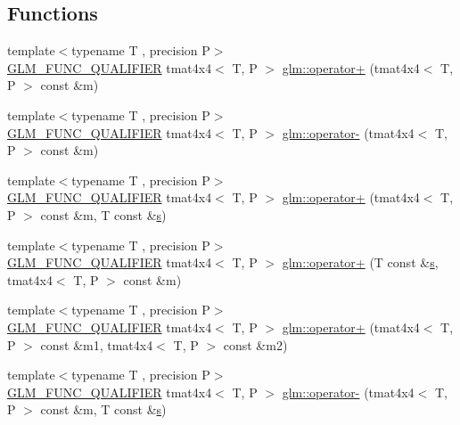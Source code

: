 \subsection*{Functions}
\begin{DoxyCompactItemize}
\item 
{\footnotesize template$<$typename T , precision P$>$ }\\\mbox{\hyperlink{setup_8hpp_a33fdea6f91c5f834105f7415e2a64407}{G\+L\+M\+\_\+\+F\+U\+N\+C\+\_\+\+Q\+U\+A\+L\+I\+F\+I\+ER}} tmat4x4$<$ T, P $>$ \mbox{\hyperlink{namespaceglm_a9989e7e3651cecf45c9b7e856978fac0}{glm\+::operator+}} (tmat4x4$<$ T, P $>$ const \&m)
\item 
{\footnotesize template$<$typename T , precision P$>$ }\\\mbox{\hyperlink{setup_8hpp_a33fdea6f91c5f834105f7415e2a64407}{G\+L\+M\+\_\+\+F\+U\+N\+C\+\_\+\+Q\+U\+A\+L\+I\+F\+I\+ER}} tmat4x4$<$ T, P $>$ \mbox{\hyperlink{namespaceglm_a86d70820c6583189bf78bef7a6bd6797}{glm\+::operator-\/}} (tmat4x4$<$ T, P $>$ const \&m)
\item 
{\footnotesize template$<$typename T , precision P$>$ }\\\mbox{\hyperlink{setup_8hpp_a33fdea6f91c5f834105f7415e2a64407}{G\+L\+M\+\_\+\+F\+U\+N\+C\+\_\+\+Q\+U\+A\+L\+I\+F\+I\+ER}} tmat4x4$<$ T, P $>$ \mbox{\hyperlink{namespaceglm_a8d33b2d0bb5b44913406bc51d992dbb2}{glm\+::operator+}} (tmat4x4$<$ T, P $>$ const \&m, T const \&\mbox{\hyperlink{glad_8h_af1b1d5edfea6a34daee7389b1b5810ad}{s}})
\item 
{\footnotesize template$<$typename T , precision P$>$ }\\\mbox{\hyperlink{setup_8hpp_a33fdea6f91c5f834105f7415e2a64407}{G\+L\+M\+\_\+\+F\+U\+N\+C\+\_\+\+Q\+U\+A\+L\+I\+F\+I\+ER}} tmat4x4$<$ T, P $>$ \mbox{\hyperlink{namespaceglm_adaf33419391a9f6e8779a0f74199013b}{glm\+::operator+}} (T const \&\mbox{\hyperlink{glad_8h_af1b1d5edfea6a34daee7389b1b5810ad}{s}}, tmat4x4$<$ T, P $>$ const \&m)
\item 
{\footnotesize template$<$typename T , precision P$>$ }\\\mbox{\hyperlink{setup_8hpp_a33fdea6f91c5f834105f7415e2a64407}{G\+L\+M\+\_\+\+F\+U\+N\+C\+\_\+\+Q\+U\+A\+L\+I\+F\+I\+ER}} tmat4x4$<$ T, P $>$ \mbox{\hyperlink{namespaceglm_a25f82613cbb54d1328ba0c087361f23a}{glm\+::operator+}} (tmat4x4$<$ T, P $>$ const \&m1, tmat4x4$<$ T, P $>$ const \&m2)
\item 
{\footnotesize template$<$typename T , precision P$>$ }\\\mbox{\hyperlink{setup_8hpp_a33fdea6f91c5f834105f7415e2a64407}{G\+L\+M\+\_\+\+F\+U\+N\+C\+\_\+\+Q\+U\+A\+L\+I\+F\+I\+ER}} tmat4x4$<$ T, P $>$ \mbox{\hyperlink{namespaceglm_a663ddfcf136f3a13694686bb0697bbde}{glm\+::operator-\/}} (tmat4x4$<$ T, P $>$ const \&m, T const \&\mbox{\hyperlink{glad_8h_af1b1d5edfea6a34daee7389b1b5810ad}{s}})

\end{DoxyCompactItemize}
